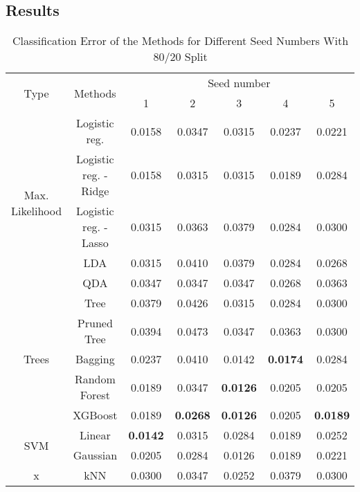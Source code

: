 \subsection{Results}
\begin{table}[htb]
	\caption{Classification Error of the Methods for Different Seed Numbers With $80/20$ Split}
	\begin{center}
		\begin{tabular}{@{} c c c  c c c c @{}}\toprule
			\multirow{2}{*}{Type} & \multirow{2}{*}{Methods} &  \multicolumn{5}{c}{Seed number}\\
			& & 1 & 2 & 3 & 4 & 5 \\
			\midrule
			\multirow{5}{*}{Max. Likelihood} & Logistic reg. & \num{0.0158} & \num{0.0347} & \num{0.0315} & \num{0.0237} & \num{0.0221} \\
			& Logistic reg. - Ridge & \num{0.0158} & \num{0.0315} & \num{0.0315} & \num{0.0189} & \num{0.0284} \\
			& Logistic reg. - Lasso & \num{0.0315} & \num{0.0363} & \num{0.0379} & \num{0.0284} & \num{0.0300} \\
			& LDA & \num{0.0315} & \num{0.0410} & \num{0.0379} & \num{0.0284} & \num{0.0268} \\
			& QDA & \num{0.0347} & \num{0.0347} & \num{0.0347} & \num{0.0268} & \num{0.0363} \\
			\cmidrule{1-7}
			\multirow{5}{*}{Trees} & Tree & \num{0.0379} & \num{0.0426} & \num{0.0315} & \num{0.0284} & \num{0.0300}\\
			& Pruned Tree & \num{0.0394} & \num{0.0473} & \num{0.0347} & \num{0.0363} & \num{0.0300}\\  
			& Bagging & \num{0.0237} & \num{0.0410} & \num{0.0142} & \textbf{\num{0.0174}} & \num{0.0284}\\
			& Random Forest & \num{0.0189} & \num{0.0347} & \textbf{\num{0.0126}} & \num{0.0205} & \num{0.0205}\\
			& XGBoost & \num{0.0189} & \textbf{\num{0.0268}} & \textbf{\num{0.0126}} & \num{0.0205} & \textbf{\num{0.0189}}\\
			\cmidrule{1-7}
			\multirow{2}{*}{SVM} & Linear & \textbf{\num{0.0142}} & \num{0.0315} & \num{0.0284} & \num{0.0189} & \num{0.0252}\\
			& Gaussian & \num{0.0205} & \num{0.0284} & \num{0.0126} & \num{0.0189} & \num{0.0221}\\
			\cmidrule{1-7}
			x & kNN & \num{0.0300} & \num{0.0347} & \num{0.0252} & \num{0.0379} & \num{0.0300}\\
			\bottomrule
			\end{tabular}
			\end{center}
			\label{tab_res_naive}
\end{table}

